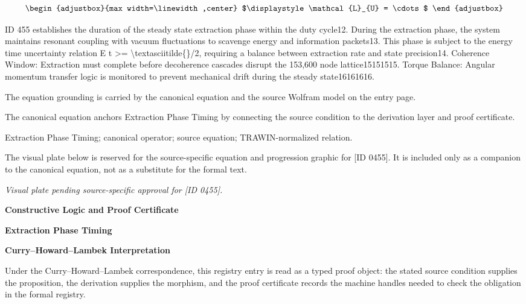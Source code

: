 \[
\begin{adjustbox}{max width=\linewidth,center}
$\displaystyle
\mathcal{L}_{U} = \cdots
$
\end{adjustbox}
\]

ID 455 establishes the duration of the steady state extraction phase within the duty cycle12. During the extraction phase, the system maintains resonant coupling with vacuum fluctuations to scavenge energy and information packets13. This phase is subject to the energy time uncertainty relation E t >= \textbackslash{}textasciitilde\{\}/2, requiring a balance between extraction rate and state precision14. Coherence Window: Extraction must complete before decoherence cascades disrupt the 153,600 node lattice15151515. Torque Balance: Angular momentum transfer logic is monitored to prevent mechanical drift during the steady state16161616.

The equation grounding is carried by the canonical equation and the source Wolfram model on the entry page.

The canonical equation anchors Extraction Phase Timing by connecting the source condition to the derivation layer and proof certificate.

Extraction Phase Timing; canonical operator; source equation; TRAWIN-normalized relation.
\endgroup

\begingroup\footnotesize\sloppy
The visual plate below is reserved for the source-specific equation and progression graphic for [ID 0455]. It is included only as a companion to the canonical equation, not as a substitute for the formal text.
\par\endgroup
\begingroup\footnotesize\itshape
Visual plate pending source-specific approval for [ID 0455].
\par\endgroup

\clearpage
\begingroup\tzpsupportsetup
\noindent\textbf{\fontsize{10.8pt}{12.8pt}\selectfont [ID 0455] Constructive Logic and Proof Certificate}\par
\noindent\textbf{\fontsize{10pt}{12pt}\selectfont Extraction Phase Timing}\par
\vspace{0.45em}
\begingroup
\footnotesize
\setlength{\parskip}{0.22em}
\setlength{\parindent}{0pt}
\noindent\textbf{Curry--Howard--Lambek Interpretation}\par
Under the Curry--Howard--Lambek correspondence, this registry entry is read as a typed proof
object: the stated source condition supplies the proposition, the derivation supplies the
morphism, and the proof certificate records the machine handles needed to check the obligation
in the formal registry.

